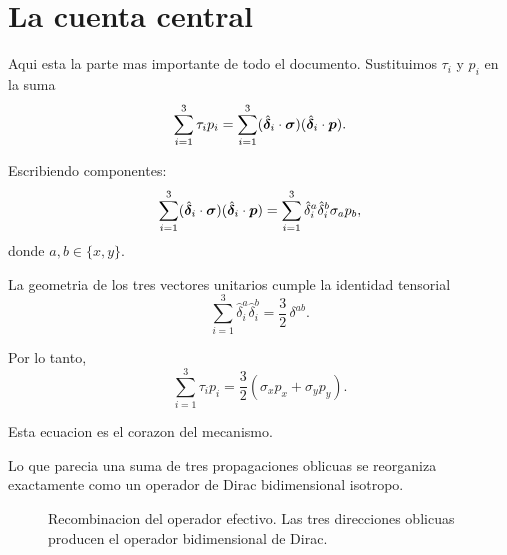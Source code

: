 \section{La cuenta central}

Aqui esta la parte mas importante de todo el documento. Sustituimos \(\tau_i\) y \(p_i\) en la suma
\begin{equation}
\sum_{i=1}^3 \tau_i p_i
=
\sum_{i=1}^3 (\hat{\bm{\delta}}_i\cdot \bm{\sigma})(\hat{\bm{\delta}}_i\cdot \bm{p}).
\label{c03:eq:keysum}
\end{equation}

Escribiendo componentes:
\begin{equation}
\sum_{i=1}^3 (\hat{\bm{\delta}}_i\cdot \bm{\sigma})(\hat{\bm{\delta}}_i\cdot \bm{p})
=
\sum_{i=1}^3 \hat{\delta}_i^a \hat{\delta}_i^b \sigma_a p_b,
\end{equation}
donde \(a,b\in\{x,y\}\).

La geometria de los tres vectores unitarios cumple la identidad tensorial
\begin{equation}
\sum_{i=1}^3 \hat{\delta}_i^a \hat{\delta}_i^b
=
\frac{3}{2}\,\delta^{ab}.
\label{c03:eq:tensorid}
\end{equation}

Por lo tanto,
\begin{equation}
\sum_{i=1}^3 \tau_i p_i
=
\frac{3}{2}\left(\sigma_x p_x + \sigma_y p_y\right).
\label{c03:eq:magic}
\end{equation}

Esta ecuacion es el corazon del mecanismo.

Lo que parecia una suma de tres propagaciones oblicuas se reorganiza exactamente como un operador de Dirac bidimensional isotropo.

\begin{figure}[ht]
\centering
{}
\caption{Recombinacion del operador efectivo. Las tres direcciones oblicuas producen el operador bidimensional de Dirac.}
\label{c03:fig:recombination}
\end{figure}

